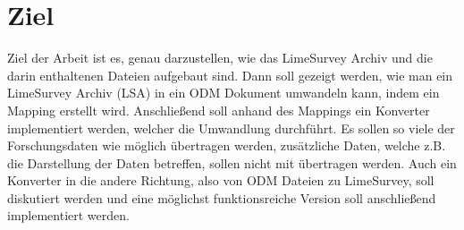 \section{Ziel}
Ziel der Arbeit ist es, genau darzustellen, wie das LimeSurvey Archiv und die darin enthaltenen Dateien aufgebaut sind.
Dann soll gezeigt werden, wie man ein LimeSurvey Archiv (LSA) in ein ODM Dokument umwandeln kann, indem ein Mapping erstellt wird.
Anschließend soll anhand des Mappings ein Konverter implementiert werden, welcher die Umwandlung durchführt.
Es sollen so viele der Forschungsdaten wie möglich übertragen werden, zusätzliche Daten, welche z.B. die Darstellung der Daten betreffen, sollen nicht mit übertragen werden.
Auch ein Konverter in die andere Richtung, also von ODM Dateien zu LimeSurvey, soll diskutiert werden und eine möglichst funktionsreiche Version soll anschließend implementiert werden.
